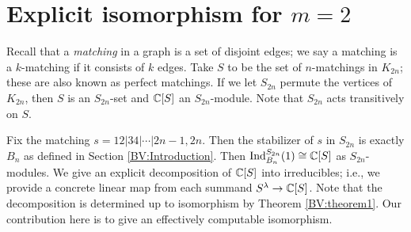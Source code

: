 \section{Explicit isomorphism for $m=2$}\label{BV:section3}
Recall that a {\em matching} in a graph is a set of disjoint edges; we say a matching is a $k$-matching if it consists of $k$ edges. Take $S$ to be the set of $n$-matchings in $K_{2n}$; these are also known as perfect matchings. If we let $S_{2n}$ permute the vertices of $K_{2n}$, then $S$ is an $S_{2n}$-set and $\mathbb{C}[S]$ an $S_{2n}$-module. Note that $S_{2n}$ acts transitively on $S$. 

Fix the matching $s = 12|34|\cdots|2n-1,2n$. Then the stabilizer of $s$ in $S_{2n}$ is exactly $B_n$ as defined in Section 
\ref{BV:Introduction}. Then $\textup{Ind}_{B_n}^{S_{2n}}(1) \cong \mathbb{C}[S]$ as $S_{2n}$-modules. We give an explicit decomposition of $\mathbb{C}[S]$ into irreducibles; i.e., we provide a concrete linear map from each summand $S^\lambda \to \mathbb{C}[S]$. Note that the decomposition is determined up to isomorphism by Theorem \ref{BV:theorem1}. Our contribution here is to give an effectively computable isomorphism.

